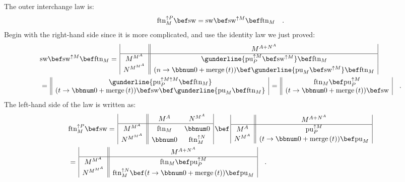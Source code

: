 The outer interchange law is:
\[
\text{ftn}_{M}^{\uparrow P}\bef\text{sw}=\text{sw}\bef\text{sw}^{\uparrow M}\bef\text{ftn}_{M}\quad.
\]
Begin with the right-hand side since it is more complicated, and use
the identity law we just proved:
\begin{align*}
 & \text{sw}\bef\text{sw}^{\uparrow M}\bef\text{ftn}_{M}=\,\begin{array}{|c||c|}
 & M^{A+N^{A}}\\
\hline M^{M^{A}} & \gunderline{\text{pu}_{P}^{\uparrow M}\bef\text{sw}^{\uparrow M}}\bef\text{ftn}_{M}\\
N^{M^{M^{A}}} & (n\rightarrow\bbnum 0+\text{merge}\,(t))\bef\gunderline{\text{pu}_{M}\bef\text{sw}^{\uparrow M}}\bef\text{ftn}_{M}
\end{array}\\
 & =\,\begin{array}{||c|}
\gunderline{\text{pu}_{P}^{\uparrow M\uparrow M}\bef\text{ftn}_{M}}\\
(t\rightarrow\bbnum 0+\text{merge}\,(t))\bef\text{sw}\bef\gunderline{\text{pu}_{M}\bef\text{ftn}_{M}}
\end{array}\,=\,\begin{array}{||c|}
\text{ftn}_{M}\bef\text{pu}_{P}^{\uparrow M}\\
(t\rightarrow\bbnum 0+\text{merge}\,(t))\bef\text{sw}
\end{array}\quad.
\end{align*}
The left-hand side of the law is written as:
\begin{align*}
 & \text{ftn}_{M}^{\uparrow P}\bef\text{sw}=\,\begin{array}{|c||cc|}
 & M^{A} & N^{M^{A}}\\
\hline M^{M^{A}} & \text{ftn}_{M} & \bbnum 0\\
N^{M^{M^{A}}} & \bbnum 0 & \text{ftn}_{M}^{\uparrow N}
\end{array}\,\bef\,\begin{array}{|c||c|}
 & M^{A+N^{A}}\\
\hline M^{A} & \text{pu}_{P}^{\uparrow M}\\
N^{M^{A}} & (t\rightarrow\bbnum 0+\text{merge}\,(t))\bef\text{pu}_{M}
\end{array}\\
 & =\,\begin{array}{|c||c|}
 & M^{A+N^{A}}\\
\hline M^{M^{A}} & \text{ftn}_{M}\bef\text{pu}_{P}^{\uparrow M}\\
N^{M^{M^{A}}} & \text{ftn}_{M}^{\uparrow N}\bef(t\rightarrow\bbnum 0+\text{merge}\,(t))\bef\text{pu}_{M}
\end{array}\quad.
\end{align*}
